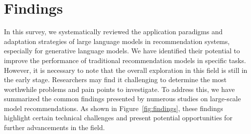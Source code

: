 \documentclass[sn-mathphys-num]{sn-jnl}%
\theoremstyle{thmstyleone}%
\theoremstyle{thmstyletwo}%
\theoremstyle{thmstylethree}%
\begin{document}
\section{Findings}
In this survey, we systematically reviewed the application paradigms and adaptation strategies of large language models in recommendation systems, especially for generative language models. We have identified their potential to improve the performance of traditional recommendation models in specific tasks. However, it is necessary to note that the overall exploration in this field is still in the early stage. Researchers may find it challenging to determine the most worthwhile problems and pain points to investigate. To address this, we have summarized the common findings presented by numerous studies on large-scale model recommendations. As shown in Figure~\ref{fig:findings}, these findings highlight certain technical challenges and present potential opportunities for further advancements in the field.
\end{document}
